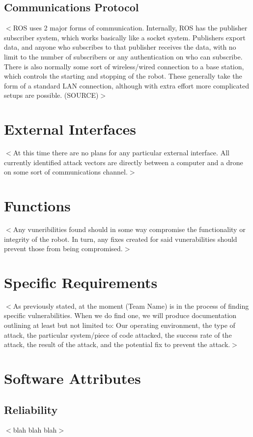 \documentclass{scrreprt}
\begin{document}
\subsection{Communications Protocol}
$<$ROS uses 2 major forms of communication. Internally, ROS has the publisher subscriber system, which works basically like a socket system.
Publishers export data, and anyone who subscribes to that publisher receives the data, with no limit to the number of
subscribers or any authentication on who can subscribe. There is also normally some sort of wireless/wired connection to a base
station, which controls the starting and stopping of the robot. These generally take the form of a standard LAN connection,
although with extra effort more complicated setups are possible. (SOURCE)$>$

\section{External Interfaces}
$<$At this time there are no plans for any particular external interface. All currently identified attack vectors are directly between
a computer and a drone on some sort of communications channel.$>$

\section{Functions}
$<$Any vuneribilities found should in some way compromise the functionality or integrity of the robot. In turn, any fixes created for said vunerabilities
should prevent those from being compromised.$>$

\section{Specific Requirements}
$<$As previously stated, at the moment (Team Name) is in the process of finding specific vulnerabilities. When we do find one, we will produce documentation outlining at least but not limited to:
Our operating environment, the type of attack, the particular system/piece of code attacked, the success rate of the attack, the result of the attack, and the potential fix to prevent the attack.$>$

\section{Software Attributes}
  \subsection{Reliability}
  $<$blah blah blah$>$
\end{document}
